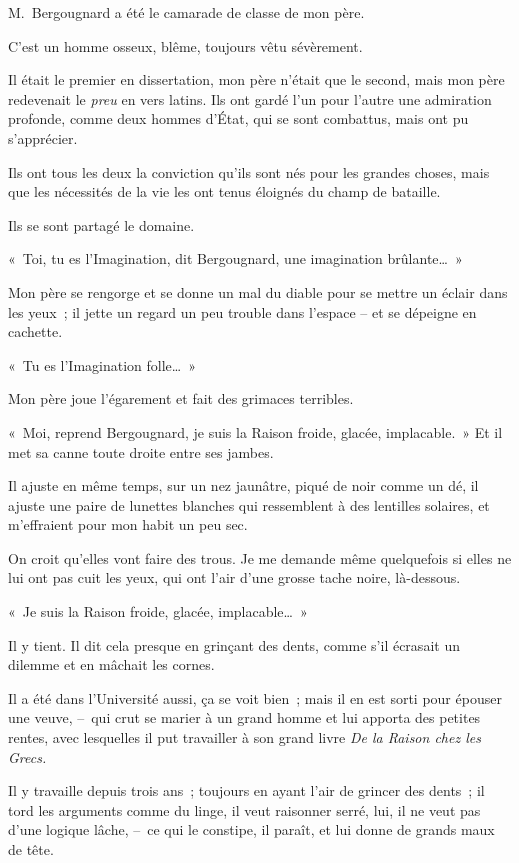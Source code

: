 \documentclass[french,twoside]{book} %
\begin{document}
\noindent M. Bergougnard a été le camarade de classe de mon père.\par
C’est un homme osseux, blême, toujours vêtu sévèrement.\par
Il était le premier en dissertation, mon père n’était que le second, mais mon père redevenait le \emph{preu} en vers latins. Ils ont gardé l’un pour l’autre une admiration profonde, comme deux hommes d’État, qui se sont combattus, mais ont pu s’apprécier.\par
Ils ont tous les deux la conviction qu’ils sont nés pour les grandes choses, mais que les nécessités de la vie les ont tenus éloignés du champ de bataille.\par
Ils se sont partagé le domaine.\par
« Toi, tu es l’Imagination, dit Bergougnard, une imagination brûlante… »\par
Mon père se rengorge et se donne un mal du diable pour se mettre un éclair dans les yeux ; il jette un regard un peu trouble dans l’espace – et se dépeigne en cachette.\par
« Tu es l’Imagination folle… »\par
Mon père joue l’égarement et fait des grimaces terribles.\par
« Moi, reprend Bergougnard, je suis la Raison froide, glacée, implacable. » Et il met sa canne toute droite entre ses jambes.\par
Il ajuste en même temps, sur un nez jaunâtre, piqué de noir comme un dé, il ajuste une paire de lunettes blanches qui ressemblent à des lentilles solaires, et m’effraient pour mon habit un peu sec.\par
On croit qu’elles vont faire des trous. Je me demande même quelquefois si elles ne lui ont pas cuit les yeux, qui ont l’air d’une grosse tache noire, là-dessous.\par
« Je suis la Raison froide, glacée, implacable… »\par
Il y tient. Il dit cela presque en grinçant des dents, comme s’il écrasait un dilemme et en mâchait les cornes.\par
Il a été dans l’Université aussi, ça se voit bien ; mais il en est sorti pour épouser une veuve, – qui crut se marier à un grand homme et lui apporta des petites rentes, avec lesquelles il put travailler à son grand livre \emph{De la Raison chez les Grecs.}\par
Il y travaille depuis trois ans ; toujours en ayant l’air de grincer des dents ; il tord les arguments comme du linge, il veut raisonner serré, lui, il ne veut pas d’une logique lâche, – ce qui le constipe, il paraît, et lui donne de grands maux de tête.\par
\end{document}
